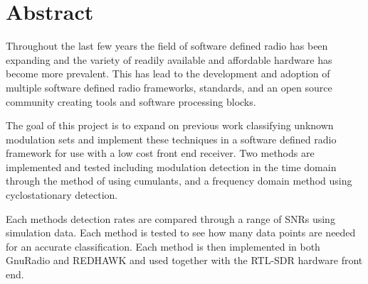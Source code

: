 \section{Abstract}

Throughout the last few years the field of software defined radio has been
expanding and the variety of readily available and affordable hardware has
become more prevalent.  This has lead to the development and adoption of
multiple software defined radio frameworks, standards, and an open source
community creating tools and software processing blocks.  

The goal of this project is to expand on previous work classifying unknown
modulation sets and implement these techniques in a software defined radio
framework for use with a low cost front end receiver.  Two methods are
implemented and tested including modulation detection in the time domain through
the method of using cumulants, and a frequency domain method using
cyclostationary detection.

Each methods detection rates are compared through a range of SNRs using
simulation data.  Each method is tested to see how many data points are needed
for an accurate classification. Each method is then implemented in both GnuRadio
and REDHAWK and used together with the RTL-SDR hardware front end. 
